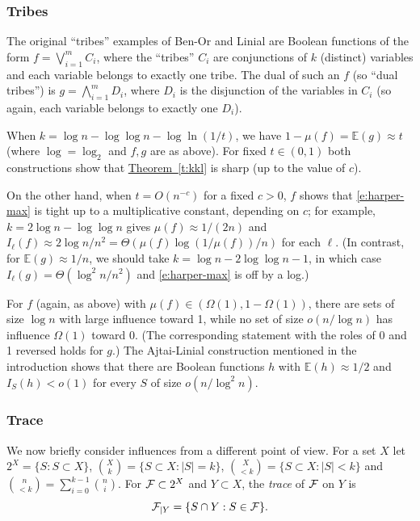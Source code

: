 \documentclass[11pt]{article}
\numberwithin{equation}{section}
\theoremstyle{definition}
\theoremstyle{plain}
\newcommand{\expref}[2]{\hyperref[#2]{#1~\ref{#2}}}
\newcommand{\f}[0]{{\cal F}}
\newcommand{\0}[0]{\emptyset}
\newcommand{\gO}[0]{\Omega}
\begin{document}
\subsubsection *{Tribes}
The original ``tribes'' examples of Ben-Or and Linial \cite{bl}
are Boolean functions of the form
$f= \bigvee_{i=1}^m C_i$, where the   %
``tribes'' $C_i$ are %
conjunctions %
of $k$ (distinct) variables
and
each variable belongs to exactly one tribe.
The dual of such an $f$ (so ``dual tribes'') is
%
$g= \bigwedge_{i=1}^m D_i$, where  %
$D_i$ is the %
disjunction %
of the variables in $C_i$
(so again, each variable belongs to exactly one $D_i$).

When $k=\log n - \log \log n - \log \ln (1/t)$,
we have $1-\mu(f)  = \mathbb E (g) \approx t$
(where $\log = \log_2$ and $f,g$ are as above).
For fixed $t\in (0,1)$ both constructions
show that \expref{Theorem}{t:kkl}
is sharp (up to the value of $c$).


On the other hand,
when $t=O(n^{-c})$ for a fixed
$c>0$, $f$ shows that \eqref{e:harper-max}
is tight up to a multiplicative constant, depending on $c$;
for example,
$k=2\log n-\log \log n$ gives
$\mu(f)  \approx 1/(2n)$ and
$I_\ell(f)\approx 2\log n/n^2=\Theta(\mu(f) \log(1/\mu(f) )/n)$
for each $\ell$.
(In contrast, for $\mathbb E (g)\approx 1/n$, we should
take $k= \log n-2\log \log n-1$, in which case
$I_\ell (g)=\Theta (\log^2n/n^2)$ and \eqref{e:harper-max}
is off by a log.)

For $f$ (again, as above) with $\mu(f)  \in (\gO(1),1-\gO(1))$,
there are sets of size $\log n$ with large influence
%
toward 1,  %
while no set of size $o(n/\log n)$ has
influence $\gO(1)$ %
toward 0.
(The corresponding statement with
the roles of 0 and 1 reversed holds for $g$.)
The Ajtai-Linial construction
mentioned in the introduction shows that there are Boolean functions
$h$ with $\mathbb E (h) \approx 1/2$ and $I_S(h) < o(1)$ for
every $S$ of size $o(n/\log^2n)$.



\subsubsection *{Trace}


We now briefly consider influences from a different point of view.
For a set $X$ let
$2^X = \{S: S \subset X\}$,
$\binom{X}{k}=\{S \subset X:|S|=k\}$,
$\binom{X}{< k}=\{S \subset X:|S| < k\}$ and 
$\binom{n}{<k}=\sum_{i=0}^{k-1} \binom{n}{i}.$
For $\f\subset 2^X$
and $Y \subset X$,
the \emph{trace} of $\cal F$ on $Y$ is
$${\cal F}_{|Y} = \{S \cap Y:
S \in {\cal F}\}.$$
\end{document}
